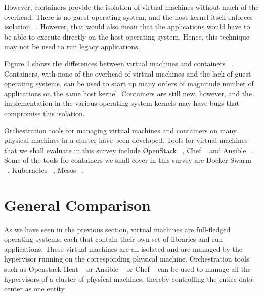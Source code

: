 \documentclass[10pt,twocolumn]{article}
\begin{document}
However, containers provide the isolation of virtual machines without much of the overhead. There is no guest operating system, and the host kernel itself enforces isolation ~\cite{intro_containerisation}.
However, that would also mean that the applications would have to be able to execute directly on the host operating system.
Hence, this technique may not be used to run legacy applications.

Figure 1 shows the differences between virtual machines and containers ~\cite{intro_containerisation}.
Containers, with none of the overhead of virtual machines and the lack of guest operating systems, can be used to start up many orders of magnitude number of applications on the same host kernel.
Containers are still new, however, and the implementation in the various operating system kernels may have bugs that compromise this isolation.

Orchestration tools for managing virtual machines and containers on many physical machines in a cluster have been developed.
Tools for virtual machines that we shall evaluate in this survey include OpenStack ~\cite{openstack}, Chef ~\cite{chef} and Ansible ~\cite{ansible}.
Some of the tools for containers we shall cover in this survey are Docker Swarm ~\cite{docker_swarm}, Kubernetes ~\cite{kubernetes}, Mesos ~\cite{mesos}.

\section{General Comparison}

As we have seen in the previous section, virtual machines are full-fledged operating systems, each that contain their own set of libraries and run applications.
These virtual machines are all isolated and are managed by the hypervisor running on the corresponding physical machine.
Orchestration tools such as Openstack Heat ~\cite{openstack} or Ansible ~\cite{ansible} or Chef ~\cite{chef} can be used to manage all the hypervisors of a cluster of physical machines, thereby controlling the entire data center as one entity.
\end{document}

